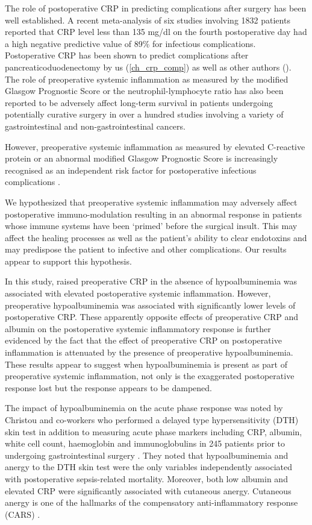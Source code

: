 The role of postoperative CRP in predicting complications after surgery has been well established. 
A recent meta-analysis of six studies involving 1832 patients \parencite{warschkow_safe_2012} reported that CRP level less than 135 mg/dl on the fourth postoperative day had a high negative predictive value of 89\% for infectious complications. 
Postoperative CRP has been shown to predict complications after pancreaticoduodenectomy by us (\ref{ch_crp_comp}) as well as other authors (\parencite{welsch_persisting_2008, hiyoshi_usefulness_2013, kosaka_multivariate_2014}).
The role of preoperative systemic inflammation as measured by the modified Glasgow Prognostic Score or the neutrophil-lymphocyte ratio has also been reported to be adversely affect long-term survival in patients undergoing potentially curative surgery in over a hundred studies involving a variety of gastrointestinal and non-gastrointestinal cancers. 

However, preoperative systemic inflammation as measured by elevated C-reactive protein or an abnormal modified Glasgow Prognostic Score is increasingly recognised as an independent risk factor for postoperative infectious complications \parencite{mohri_correlation_2014, kubo_elevated_2013, moyes_preoperative_2009}.

We hypothesized that preoperative systemic inflammation may adversely affect postoperative immuno-modulation resulting in an abnormal response in patients whose immune systems have been `primed' before the surgical insult. 
This may affect the healing processes as well as the patient's ability to clear endotoxins and may predispose the patient to infective and other complications.
Our results appear to support this hypothesis. 

In this study, raised preoperative CRP in the absence of hypoalbuminemia was associated with elevated postoperative systemic inflammation.
However, preoperative hypoalbuminemia was associated with significantly lower levels of postoperative CRP.
These apparently opposite effects of preoperative CRP and albumin on the postoperative systemic inflammatory response is further evidenced by the fact that the effect of preoperative CRP on postoperative inflammation is attenuated by the presence of preoperative hypoalbuminemia.
These results appear to suggest when hypoalbuminemia is present as part of preoperative systemic inflammation, not only is the exaggerated postoperative response lost but the response appears to be dampened. 

The impact of hypoalbuminemia on the acute phase response was noted by Christou and co-workers who performed a delayed type hypersensitivity (DTH) skin test in addition to measuring acute phase markers including CRP, albumin, white cell count, haemoglobin and immunoglobulins in 245 patients prior to undergoing gastrointestinal surgery \parencite{christou_estimating_1989}.
They noted that hypoalbuminemia and anergy to the DTH skin test were the only variables independently associated with postoperative sepsis-related mortality.
Moreover, both low albumin and elevated CRP were significantly associated with cutaneous anergy.
Cutaneous anergy is one of the hallmarks of the compensatory anti-inflammatory response (CARS) \parencite{ward_compensatory_2008}.

